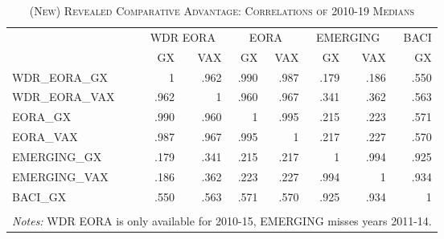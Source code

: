 \documentclass[a4paper]{article}
\begin{document}
\begin{table}[ht]
\centering
\caption{\label{tab:NRCA_corr}\textsc{(New) Revealed Comparative Advantage: Correlations of 2010-19 Medians}}
\vspace{2mm}
\begin{tabular}{lrrrrrrr}
  \toprule
  & \multicolumn{2}{c}{WDR EORA} & \multicolumn{2}{c}{EORA} & \multicolumn{2}{c}{EMERGING} & BACI \\
 & GX & VAX & GX & VAX & GX & VAX & GX \\ 
  \midrule
  WDR\_EORA\_GX &    1   &  .962 &  .990 &  .987 &  .179 &  .186 &  .550 \\ 
  WDR\_EORA\_VAX &  .962 &    1   &  .960 &  .967 &  .341 &  .362 &  .563 \\ 
  EORA\_GX &  .990 &  .960 &    1   &  .995 &  .215 &  .223 &  .571 \\ 
  EORA\_VAX &  .987 &  .967 &  .995 &    1   &  .217 &  .227 &  .570 \\ 
  EMERGING\_GX &  .179 &  .341 &  .215 &  .217 &    1   &  .994 &  .925 \\ 
  EMERGING\_VAX &  .186 &  .362 &  .223 &  .227 &  .994 &    1   &  .934 \\ 
  BACI\_GX &  .550 &  .563 &  .571 &  .570 &  .925 &  .934 &    1   \\ 
   \bottomrule \\ [-0.9em]
\multicolumn{8}{l}{\parbox{0.7\textwidth}{\scriptsize
\textit{Notes:} WDR EORA is only available for 2010-15, EMERGING misses years 2011-14.}}
\end{tabular}
\end{table}
\end{document}
